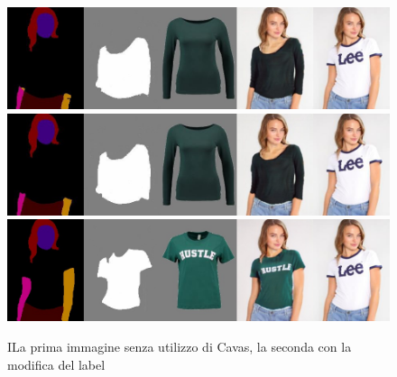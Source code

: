 \documentclass[final, 11pt]{article}
\begin{document}
	
	\begin{figure}[!htb]
		\centering
		\includegraphics[width=0.7\linewidth]{demo2.jpg}
		\includegraphics[width=0.7\linewidth]{demo2_b.jpg}
		\includegraphics[width=0.7\linewidth]{OtherRes.jpg}
		\caption{ILa prima immagine senza utilizzo di Cavas, la seconda con la modifica del label}
	\end{figure} 


	
\end{document}
